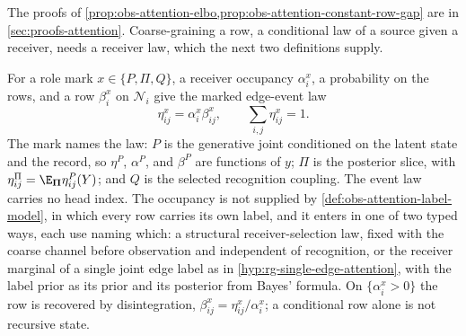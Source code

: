 The proofs of \cref{prop:obs-attention-elbo,prop:obs-attention-constant-row-gap} are in \cref{sec:proofs-attention}.
Coarse-graining a row, a conditional law of a source given a receiver, needs a
receiver law, which the next two definitions supply.

For a role mark \(x\in\{P,\Pi,Q\}\), a receiver occupancy \(\alpha^x_i\), a
probability on the rows, and a row \(\beta^x_i\) on \(\mathcal N_i\) give the
marked edge-event law
\begin{equation}
\eta^x_{ij}=\alpha^x_i\beta^x_{ij},
\qquad
\sum_{i,j}\eta^x_{ij}=1.
\label{eq:rg-attention-event-law}
\end{equation}
The mark names the law: \(P\) is the generative joint conditioned on the latent
state and the record, so \(\eta^P\), \(\alpha^P\), and \(\beta^P\) are
functions of \(y\); \(\Pi\) is the posterior slice, with
\(\eta^\Pi_{ij}=\E_{\boldsymbol\Pi}\eta^P_{ij}(Y)\); and \(Q\) is the selected
recognition coupling. The event law carries no head index. The occupancy is
not supplied by \cref{def:obs-attention-label-model}, in which every row
carries its own label, and it enters in one of two typed ways, each use naming
which: a structural receiver-selection law, fixed with the coarse channel
before observation and independent of recognition, or the receiver marginal of
a single joint edge label as in \cref{hyp:rg-single-edge-attention}, with the
label prior as its prior and its posterior from Bayes' formula. On
\(\{\alpha^x_i>0\}\) the row is recovered by disintegration,
\(\beta^x_{ij}=\eta^x_{ij}/\alpha^x_i\); a conditional row alone is not
recursive state.

